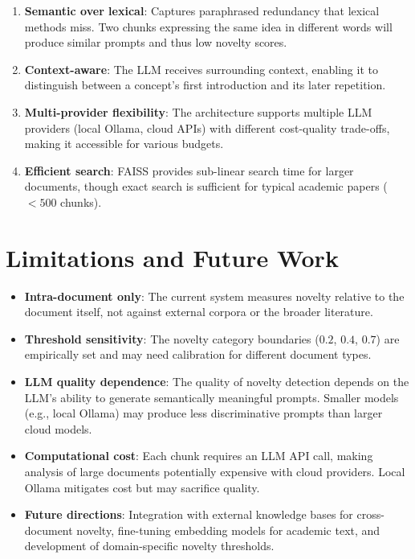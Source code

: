 \documentclass[11pt,a4paper]{article}
\begin{document}
\begin{enumerate}
\item \textbf{Semantic over lexical}: Captures paraphrased redundancy that
lexical methods miss. Two chunks expressing the same idea in different words
will produce similar prompts and thus low novelty scores.

\item \textbf{Context-aware}: The LLM receives surrounding context, enabling it
to distinguish between a concept's first introduction and its later repetition.

\item \textbf{Multi-provider flexibility}: The architecture supports multiple
LLM providers (local Ollama, cloud APIs) with different cost-quality
trade-offs, making it accessible for various budgets.

\item \textbf{Efficient search}: FAISS provides sub-linear search time for
larger documents, though exact search is sufficient for typical academic papers
($< 500$ chunks).
\end{enumerate}

\section{Limitations and Future Work}

\begin{itemize}
\item \textbf{Intra-document only}: The current system measures novelty relative
to the document itself, not against external corpora or the broader literature.

\item \textbf{Threshold sensitivity}: The novelty category boundaries ($0.2$,
$0.4$, $0.7$) are empirically set and may need calibration for different
document types.

\item \textbf{LLM quality dependence}: The quality of novelty detection depends
on the LLM's ability to generate semantically meaningful prompts. Smaller models
(e.g., local Ollama) may produce less discriminative prompts than larger cloud
models.

\item \textbf{Computational cost}: Each chunk requires an LLM API call,
making analysis of large documents potentially expensive with cloud providers.
Local Ollama mitigates cost but may sacrifice quality.

\item \textbf{Future directions}: Integration with external knowledge bases for
cross-document novelty, fine-tuning embedding models for academic text,
and development of domain-specific novelty thresholds.
\end{itemize}
\end{document}
